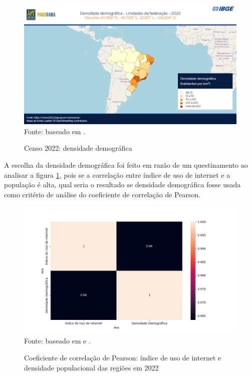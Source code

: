 \begin{figure}[H]
    \centering
    \caption{Censo 2022: densidade demográfica}
    \includegraphics[width=1\linewidth]{figuras/populacao/censo_2022_densidade_demografica.png}
    \label{fig:densidade_demografica}
    \footnotesize{Fonte: baseado em \cite{IBGE_censo_2022}.}
\end{figure}

A escolha da densidade demográfica foi feito em razão de um questinamento ao analisar a figura \ref{fig:densidade_demografica}, pois se a correlação entre índice de uso de internet e a população é alta, qual seria o resultado se densidade demográfica fosse usada como critério de análise do coeficiente de correlação de Pearson.

\begin{figure}[H]
    \centering
    \caption{Coeficiente de correlação de Pearson: índice de uso de internet e densidade populacional das regiões em 2022}
    \includegraphics[width=1\linewidth]{figuras/internet/correlacao2.png}
    \label{fig:correlacao2}
    \footnotesize{Fonte: baseado em \cite{IBGE_censo_2022} e \cite{pnda_continua_anual_2016_2023}.}
\end{figure}

